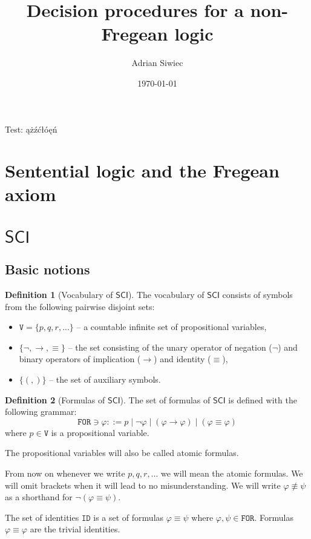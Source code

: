 \documentclass{article}
\title{Decision procedures for a non-Fregean logic \SCI}
\author{Adrian Siwiec}
\theoremstyle{definition}
\newtheorem{definition}{Definition}[section]
\theoremstyle{definition}
\theoremstyle{definition}
\newcommand*{\id}{\equiv}
\newcommand*{\ra}{\rightarrow}
\newcommand*{\V}{\texttt{V}}
\newcommand*{\FOR}{\texttt{FOR}}
\newcommand*{\ID}{\texttt{ID}}
\newcommand{\SCI}{$\mathsf{SCI}$\xspace}
\begin{document}
\date{\today}

\maketitle

Test: ążźćłóęń

\section{Sentential logic and the Fregean axiom}
\section{\SCI}
\subsection{Basic notions}

\begin{definition}[Vocabulary of \SCI]
    The vocabulary of \SCI consists of symbols from the following pairwise disjoint sets:
    \begin{itemize}
        \item $\V = \{p, q, r, ...\}$ -- a countable infinite set of propositional variables,
        \item $\{\lnot, \ra, \id \}$  -- the set consisting of the unary operator of negation ($\lnot$) and binary operators of implication ($\ra$) and identity ($\id$),
        \item $\{(,)\}$ -- the set of auxiliary symbols.
    \end{itemize}
\end{definition}
\begin{definition}[Formulas of \SCI]
    The set of formulas of \SCI is defined with the following grammar:
    $$
        \FOR \ni \varphi ::= p  \; | \;  \lnot \varphi \; | \; (\varphi \ra \varphi) \; | \; (\varphi \id \varphi)
    $$ where $p \in \V$ is a propositional variable.
\end{definition}
The propositional variables will also be called atomic formulas.

From now on whenever we write $p, q, r, ... $ we will mean the atomic formulas.
We will omit brackets when it will lead to no misunderstanding. We will write
$\varphi \not \id \psi$ as a shorthand for $\lnot(\varphi \id \psi)$.

The set of identities $\ID$ is a set of formulas $\varphi \id \psi$ where
$\varphi, \psi \in \FOR$. Formulas $\varphi \id \varphi$ are the trivial
identities.
\end{document}

